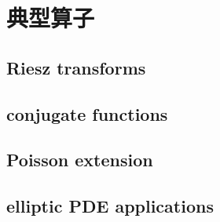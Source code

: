 \section{典型算子}
\label{b2:sec:1805}


\subsection{Riesz transforms}
\label{b2:subsec:180501}

\subsection{conjugate functions}
\label{b2:subsec:180502}

\subsection{Poisson extension}
\label{b2:subsec:180503}

\subsection{elliptic PDE applications}
\label{b2:subsec:180504}


